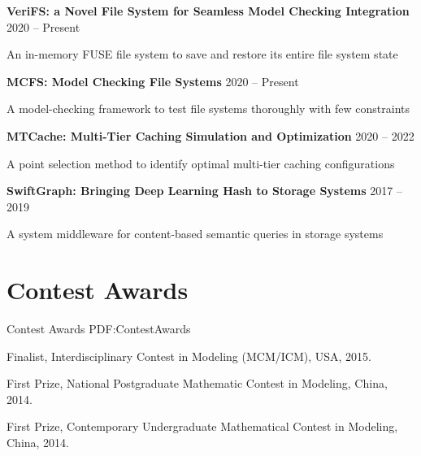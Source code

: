 \documentclass[letterpaper,10pt,oneside]{article}
\newcommand{\CVNote}{CV updated on {\DatestampYM{2023}{06}} }
\begin{document}
\begin{body}
\textbf{VeriFS: a Novel File System for Seamless Model Checking Integration}
\hfill
2020 -- 
Present

\BulletItem
An in-memory FUSE file system to save and restore its entire file system state 

\GapNoBreak

\textbf{MCFS: Model Checking File Systems}
\hfill
2020 -- 
Present

\BulletItem
A model-checking framework to test file systems thoroughly with few constraints

\GapNoBreak

\textbf{MTCache: Multi-Tier Caching Simulation and Optimization}
\hfill
2020 -- 
2022

\BulletItem
A point selection method to identify optimal multi-tier caching configurations 

\GapNoBreak

\textbf{SwiftGraph: Bringing Deep Learning Hash to Storage Systems}
\hfill
2017 -- 
2019

\BulletItem
A system middleware for content-based semantic queries in storage systems





\section
{Contest Awards}
{Contest Awards}
{PDF:ContestAwards}

\BulletItem
Finalist, Interdisciplinary Contest in Modeling (MCM/ICM), USA, 2015.

\GapNoBreak

\BulletItem
First Prize, National Postgraduate Mathematic Contest in Modeling, China, 2014.

\GapNoBreak

\BulletItem
First Prize, Contemporary Undergraduate Mathematical Contest in Modeling, China, 2014.











\end{body}



\label{LastPage}~
\end{document}
